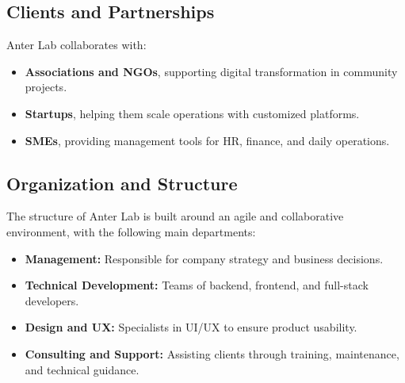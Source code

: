 \subsection{Clients and Partnerships}
Anter Lab collaborates with:
\begin{itemize}
    \item \textbf{Associations and NGOs}, supporting digital transformation in community projects.
    \item \textbf{Startups}, helping them scale operations with customized platforms.
    \item \textbf{SMEs}, providing management tools for HR, finance, and daily operations.
\end{itemize}

\subsection{Organization and Structure}
The structure of Anter Lab is built around an agile and collaborative environment, with the following main departments:
\begin{itemize}
    \item \textbf{Management:} Responsible for company strategy and business decisions.
    \item \textbf{Technical Development:} Teams of backend, frontend, and full-stack developers.
    \item \textbf{Design and UX:} Specialists in UI/UX to ensure product usability.
    \item \textbf{Consulting and Support:} Assisting clients through training, maintenance, and technical guidance.
\end{itemize}

